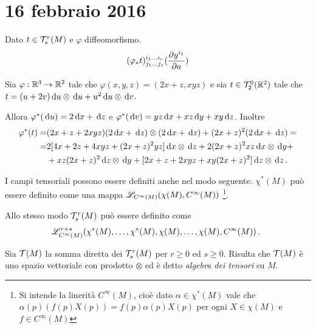 \chapter{16 febbraio 2016}

Dato $t\in \mathcal T_s^r(M)$ e $\varphi$ diffeomorfismo.
\begin{equation*}
	(\varphi_*t)_{j_1\ldots j_s}^{i_1\ldots i_r} (\frac{\partial y^{i_1}}{\partial a})
\end{equation*}



\begin{example}
	Sia $\varphi:\mathbb R^3\to\mathbb R^2$ tale che $\varphi(x,y,z) = (2x+z,xyz)$ e sia $t\in \mathcal T_2^0(\mathbb R^2)$ tale che $t = (u+2v)\,\mathrm d u\otimes \,\mathrm d u + u^2 \,\mathrm d u \otimes \,\mathrm d v$.
	
	Allora $\varphi^*(\,\mathrm d u) = 2\,\mathrm d x +\,\mathrm d z$ e $\varphi^*(\,\mathrm d v) = yz \,\mathrm d x + xz \,\mathrm d y + xy \,\mathrm d z$.
	Inoltre
	\begin{align*}
	\varphi^*(t) =& (2x+z + 2xyz) (2\,\mathrm d x + \,\mathrm d z) \otimes (2\,\mathrm d x + \,\mathrm d z) + (2x+z)^2 (2\,\mathrm d x + \,\mathrm d z) = \\
	=& 2 [4x + 2z + 4xyz + (2x + z)^2 yz] \,\mathrm d x \otimes \,\mathrm d z + 2 (2x+z)^2 xz \,\mathrm d x \otimes \,\mathrm d y +\\
	&+ xz (2x+z)^2 \,\mathrm d z \otimes \,\mathrm d y + [2x + z + 2xyz + xy (2x+z)^2] \,\mathrm d z \otimes \,\mathrm d z \, \text{. }
	\end{align*}
\end{example}

\begin{remark}
	I campi tensoriali possono essere definiti anche nel modo seguente.
	$\chi^*(M)$ può essere definito come una mappa $\mathscr L_{C^\infty(M)} (\chi(M), C^\infty(M))$ \footnote{Si intende la linerità $C^\infty(M)$, cioè dato $\alpha\in\chi^*(M)$ vale che $\alpha(p)(f(p)X(p)) = f(p) \alpha(p) X(p)$ per ogni $X\in\chi(M)$ e $f\in C^\infty(M)$}.
	
	Allo stesso modo $\mathcal T_s^r(M)$ può essere definito come
	\begin{equation*}
	\Lin_{C^\infty(M)}^{r+s}(\chi^*(M),\ldots,\chi^*(M),\chi(M),\ldots,\chi(M),C^\infty(M))\punto %
	\end{equation*}
\end{remark}

\begin{definition} 
	Sia $\mathcal T(M)$ la somma diretta dei $\mathcal T_s^r(M)$ per $r\ge 0$ ed $s\ge 0$. Risulta che $\mathcal T(M)$ è uno spazio vettoriale con prodotto $\otimes$ ed è detto \emph{algebra dei tensori} su $M$.
\end{definition}

